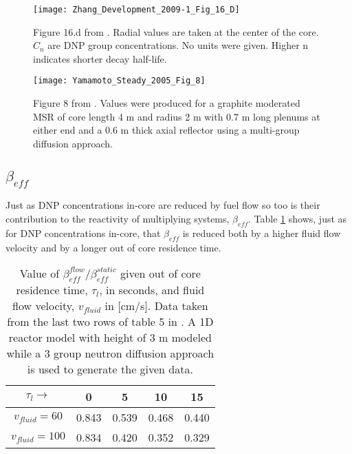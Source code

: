 \documentclass[review]{elsarticle}
\begin{document}
\begin{figure}[h]
   \centering
   \texttt{[image: Zhang\_Development\_2009-1\_Fig\_16\_D]}
   \caption{Figure 16.d from \cite{zhang_development_2009-1}. 
               Radial
               values are taken at the center of the core. $C_{n}$ are DNP
               group concentrations. No units were given. Higher n indicates
               shorter decay half-life.}
   \label{fig:zhang_radial_velocity_dnp_2}
\end{figure}

\begin{figure}[h]
   \centering
   \texttt{[image: Yamamoto\_Steady\_2005\_Fig\_8]}
   \caption{Figure 8 from \cite{yamamoto_steady_2005}. Values were produced for
    a graphite moderated MSR of core length 4 m and radius 2 m with 0.7 m long 
    plenums at either end and a 0.6 m thick axial reflector using a
    multi-group diffusion approach.}
   \label{fig:yamamoto_transit_time}
\end{figure}

\subsection{$\beta_{eff}$} \label{ssec:beta}
Just as DNP concentrations in-core are reduced by fuel flow so too is their
contribution to the reactivity of multiplying systems, $\beta_{eff}$.
Table \ref{tbl:mattioda_beta_reduction} shows, just as for DNP concentrations
in-core, that $\beta_{eff}$ is reduced both by a higher fluid flow velocity and
by a longer out of core residence time.

\begin{table}[h]
    \caption{Value of $\beta_{eff}^{flow}/\beta_{eff}^{static}$ given out of
        core residence time, $\tau_{l}$, in seconds, 
        and fluid flow velocity, $v_{fluid}$ in [cm/s]. Data taken from
        the last two rows of table 5
        in \cite{mattioda_effective_2000}. A 1D reactor model with height of 3 m
        modeled while a 3 group neutron diffusion approach is used to generate
        the given data.} 
    \label{tbl:mattioda_beta_reduction}
    \begin{center}
        \begin{tabular}{|c|c|c|c|c|}
            \hline
            $\tau_{l}\rightarrow$ & 0 & 5 & 10 & 15 \\
            \hline
            $v_{fluid} = 60$ & 0.843 & 0.539 & 0.468 & 0.440 \\
            \hline
            $v_{fluid} = 100$ & 0.834 & 0.420 & 0.352 & 0.329 \\
            \hline
        \end{tabular}
    \end{center}
\end{table}
\end{document}
